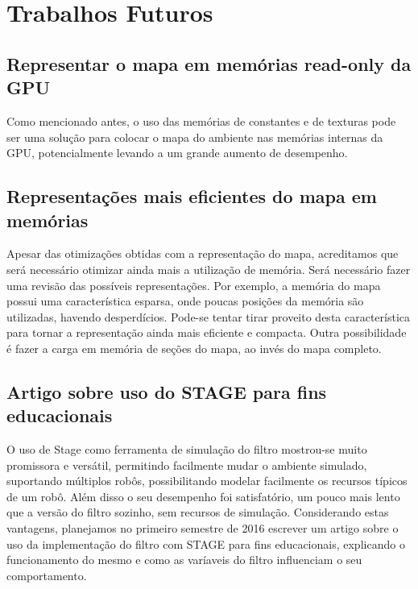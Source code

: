 \documentclass[
	12pt,				%
	openright,			%
	oneside,			%
	a4paper,			%
	english,			%
	french,				%
	spanish,			%
	brazil,				%
	]{abntex2}
\newcommand\todo[1]{~\newline{\color{red}\framebox[\columnwidth]{\parbox{.95\linewidth}{TODO: #1}}}~\newline}
\newcommand\todo[1]{}
\begin{document}
\section{Trabalhos Futuros}


\subsection{Representar o mapa em memórias read-only da GPU}

Como mencionado antes, o uso das memórias de constantes e de texturas pode ser uma solução para colocar o mapa do ambiente nas memórias internas da GPU, potencialmente levando a um grande aumento de desempenho.

\subsection{Representações mais eficientes do mapa em memórias}

Apesar das otimizações obtidas com a representação do mapa, acreditamos que será necessário otimizar ainda mais a utilização de memória. Será necessário fazer uma revisão das possíveis representações. Por exemplo, a memória do mapa possui uma característica esparsa, onde poucas posições da memória são utilizadas, havendo desperdícios. Pode-se tentar tirar proveito desta característica para tornar a representação ainda mais eficiente e compacta. Outra possibilidade é fazer a carga em memória de seções do mapa, ao invés do mapa completo.

\subsection{Artigo sobre uso do STAGE para fins educacionais}

O uso de Stage como ferramenta de simulação do filtro mostrou-se muito promissora e versátil, permitindo facilmente mudar o ambiente simulado, suportando múltiplos robôs, possibilitando modelar facilmente os recursos típicos de um robô. Além disso o seu desempenho foi satisfatório, um pouco mais lento que a versão do filtro sozinho, sem recursos de simulação. Considerando estas vantagens, planejamos no primeiro semestre de 2016 escrever um artigo sobre o uso da implementação do filtro com STAGE para fins educacionais, explicando o funcionamento do mesmo e como as varíaveis do filtro influenciam o seu comportamento.
\end{document}

